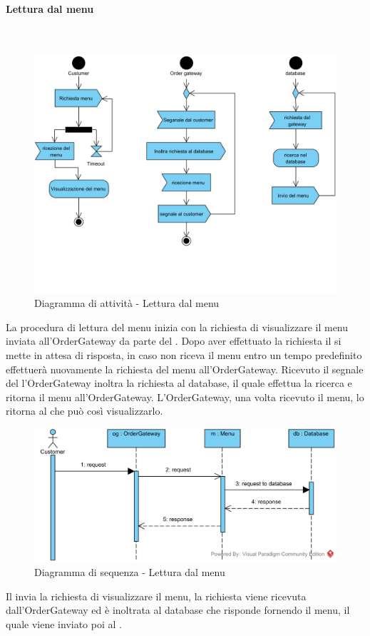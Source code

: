 \paragraph{Lettura dal menu}\mbox{}\\
\nopagebreak
\begin{figure}[H]
	\centering
	\includegraphics[width=14cm]{diagrammi_img/attivita/costumer_get_menu.png}
	\caption{Diagramma di attività - Lettura dal menu}
\end{figure}
La procedura di lettura del menu inizia con la richiesta di visualizzare il menu inviata all'OrderGateway da parte del \Customer{}. Dopo aver effettuato la richiesta il \Customer{} si mette in attesa di risposta, in caso non riceva il menu entro un tempo predefinito effettuerà nuovamente la richiesta del menu all'OrderGateway. Ricevuto il segnale del \Customer{} l'OrderGateway inoltra la richiesta al database, il quale effettua la ricerca e ritorna il menu all'OrderGateway. L'OrderGateway, una volta ricevuto il menu, lo ritorna al \Customer{} che può così visualizzarlo. 

\begin{figure}[H]
	\centering
	\includegraphics[width=14cm]{../../documenti/SpecificaTecnica/diagrammi_img/sequenza/client_visualizza_menu.png}
	\caption{Diagramma di sequenza - Lettura dal menu}
\end{figure}
Il \Customer{} invia la richiesta di visualizzare il menu, la richiesta viene ricevuta dall'Order\-Gateway ed è inoltrata al database che risponde fornendo il menu, il quale viene inviato poi al \Customer{}.


